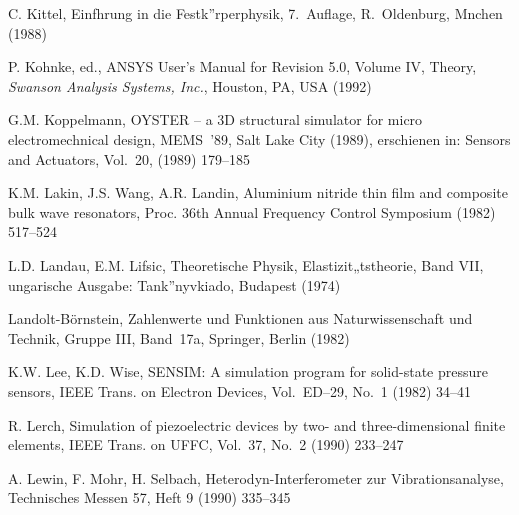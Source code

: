 \begin{thebibliography}{xxx}
 C. Kittel, Einfhrung in die Festk”rperphysik, 7.~Auflage, R.~Oldenburg,
 Mnchen (1988)

 P. Kohnke, ed., {\sf ANSYS} User's Manual for Revision 5.0, Volume IV,
 Theory, {\em Swanson Analysis Systems, Inc.}, Houston, PA, USA (1992)

 G.M. Koppelmann, {\sf OYSTER} -- a 3D structural simulator for micro
 electromechnical design, MEMS~'89, Salt Lake City (1989), erschienen in:
 Sensors and Actuators, Vol.~20, (1989) 179--185

 K.M. Lakin, J.S. Wang, A.R. Landin, Aluminium nitride thin film and
 composite bulk wave resonators, Proc. 36th Annual Frequency Control
 Symposium (1982) 517--524



 L.D. Landau, E.M. Lifsic, Theoretische Physik, Elastizit„tstheorie,
 Band VII, ungarische Ausgabe: Tank”nyvkiado, Budapest (1974)


 Landolt-Börnstein, Zahlenwerte und Funktionen aus Naturwissenschaft und
 Technik, Gruppe III, Band~17a, Springer, Berlin (1982)

 K.W. Lee, K.D. Wise, {\sf SENSIM}: A simulation program for solid-state
 pressure sensors, IEEE Trans. on Electron Devices, Vol.~ED--29, No.~1 (1982)
 34--41


 R. Lerch, Simulation of piezoelectric devices by two- and three-dimensional
 finite elements, IEEE Trans. on UFFC, Vol.~37, No.~2 (1990) 233--247

 A. Lewin, F. Mohr, H. Selbach, Heterodyn-Interferometer zur
 Vibrationsanalyse, Technisches Messen 57, Heft 9 (1990) 335--345


\end{thebibliography}
